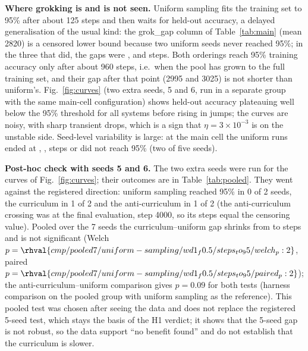 \textbf{Where grokking is and is not seen.} Uniform sampling fits the training set to 95\% after about 125 steps and then waits for held-out accuracy, a delayed generalisation of the usual kind: the grok\_gap column of Table~\ref{tab:main} (mean 2820) is a censored lower bound because two uniform seeds never reached 95\%; in the three that did, the gaps were ,  and  steps. Both orderings reach 95\% training accuracy only after about 960 steps, i.e.\ when the pool has grown to the full training set, and their gap after that point (2995 and 3025) is not shorter than uniform's. Fig.~\ref{fig:curves} (two extra seeds, 5 and 6, run in a separate group with the same main-cell configuration) shows held-out accuracy plateauing well below the 95\% threshold for all systems before rising in jumps; the curves are noisy, with sharp transient drops, which is a sign that $\eta=3\times10^{-3}$ is on the unstable side. Seed-level variability is large: at the main cell the uniform runs ended at , ,  steps or did not reach 95\% (two of five seeds).

\textbf{Post-hoc check with seeds 5 and 6.} The two extra seeds were run for the curves of Fig.~\ref{fig:curves}; their outcomes are in Table~\ref{tab:pooled}. They went against the registered direction: uniform sampling reached 95\% in 0 of 2 seeds, the curriculum in 1 of 2 and the anti-curriculum in 1 of 2 (the anti-curriculum crossing was at the final evaluation, step 4000, so its steps equal the censoring value). Pooled over the 7 seeds the curriculum--uniform gap shrinks from  to  steps and is not significant (Welch $p=\rhval{cmp/pooled7/uniform-sampling/wd1_f0.5/steps_to_95/welch_p:2}$, paired $p=\rhval{cmp/pooled7/uniform-sampling/wd1_f0.5/steps_to_95/paired_p:2}$); the anti-curriculum--uniform comparison gives $p=0.09$ for both tests (harness comparison on the pooled group with uniform sampling as the reference). This pooled test was chosen after seeing the data and does not replace the registered 5-seed test, which stays the basis of the H1 verdict; it shows that the 5-seed gap is not robust, so the data support ``no benefit found'' and do not establish that the curriculum is slower.

\begin{table}[t]\centering\caption{Main cell, registered seeds 0--4, extra seeds 5--6, and pooled 7 seeds (post hoc). $p$ values compare the named system with uniform sampling.}\label{tab:pooled}
\resizebox{\columnwidth}{!}{}\end{table}

